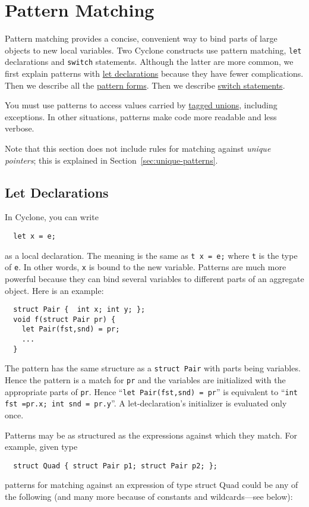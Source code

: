 \section{Pattern Matching}
\label{sec:patterns}

Pattern matching provides a concise, convenient way to bind parts of
large objects to new local variables.  Two Cyclone constructs use
pattern matching, \texttt{let} declarations and \texttt{switch} statements.  Although
the latter are more common, we first explain patterns with
\hyperlink{let_decls}{let declarations} because they have fewer
complications.  Then we describe all the \hyperlink{pat_forms}{pattern
  forms}.  Then we describe \hyperlink{switch_stmt}{switch
  statements}.

You must use patterns to access values carried by
\hyperref[{sec:taggedunions}]{tagged unions}, including exceptions.  In
other situations, patterns make code more readable and less verbose.

Note that this section does not include rules for matching against
  \emph{unique pointers}; this is explained in
  Section~\ref{sec:unique-patterns}.

\subsection{Let Declarations}\hypertarget{let_decls}{}

In Cyclone, you can write
\begin{verbatim}
  let x = e;
\end{verbatim}
as a local declaration.  The meaning is the same as \texttt{t x = e;}
where \texttt{t} is the type of \texttt{e}.  In other words,
\texttt{x} is bound to the new variable.  Patterns are much more
powerful because they can bind several variables to different parts of
an aggregate object.  Here is an example:
\begin{verbatim}
  struct Pair {  int x; int y; };
  void f(struct Pair pr) {
    let Pair(fst,snd) = pr;
    ...
  }
\end{verbatim}

The pattern has the same structure as a \texttt{struct Pair} with parts
being variables.  Hence the pattern is a match for \texttt{pr} and the
variables are initialized with the appropriate parts of \texttt{pr}.  Hence
``\texttt{let Pair(fst,snd) = pr}'' is equivalent to
``\texttt{int fst =pr.x; int snd = pr.y}''.  A let-declaration's
initializer is evaluated only once.

Patterns may be as structured as the expressions against which they
match.  For example, given type
\begin{verbatim}
  struct Quad { struct Pair p1; struct Pair p2; };
\end{verbatim}
patterns for matching against an expression of type struct Quad could
be any of the following (and many more because of constants and
wildcards---see below):

